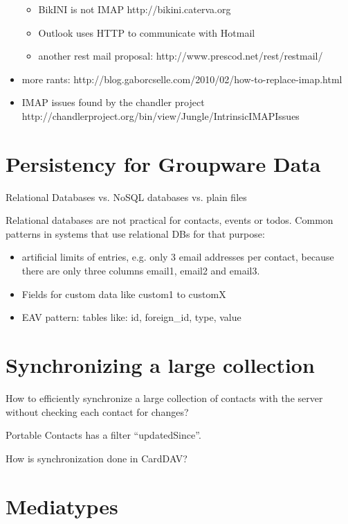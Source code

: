 \documentclass[12pt,a4paper]{scrartcl}		%
\begin{document}
\begin{itemize}
\begin{itemize}
  \item BikINI is not IMAP http://bikini.caterva.org
  \item Outlook uses HTTP to communicate with Hotmail
  \item another rest mail proposal: http://www.prescod.net/rest/restmail/
  \end{itemize}
\item more rants: http://blog.gaborcselle.com/2010/02/how-to-replace-imap.html
\item IMAP issues found by the chandler project http://chandlerproject.org/bin/view/Jungle/IntrinsicIMAPIssues
\end{itemize}

\section{Persistency for Groupware Data}
Relational Databases vs. NoSQL databases vs. plain files

Relational databases are not practical for contacts, events or todos. Common patterns in systems that use relational DBs for that purpose:
\begin{itemize}
\item artificial limits of entries, e.g. only 3 email addresses per contact, because there are only three columns email1, email2 and email3.
\item Fields for custom data like custom1 to customX
\item EAV pattern: tables like: id, foreign\_id, type, value
\end{itemize}
\section{Synchronizing a large collection}

How to efficiently synchronize a large collection of contacts with the server without checking each contact for changes?

Portable Contacts has a filter ``updatedSince''.

How is synchronization done in CardDAV?

\section{Mediatypes}

\end{document}
